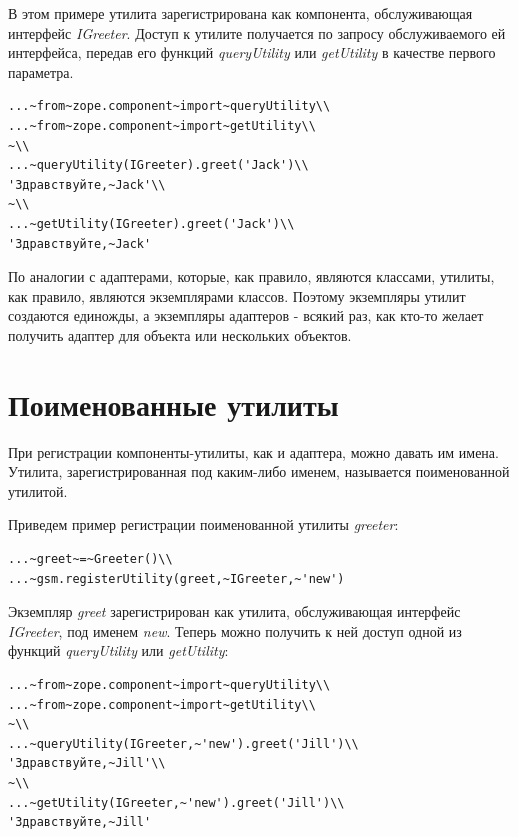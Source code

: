\documentclass[a4paper,openany,twoside,draft]{book}
\providecommand*{\DUroletitlereference}[1]{\textsl{#1}}
\begin{document}
В этом примере утилита зарегистрирована как компонента, обслуживающая
интерфейс \DUroletitlereference{IGreeter}.  Доступ к утилите получается по запросу
обслуживаемого ей интерфейса, передав его функций \DUroletitlereference{queryUtility} или
\DUroletitlereference{getUtility} в качестве первого параметра.

\begin{verbatim}
...~from~zope.component~import~queryUtility\\
...~from~zope.component~import~getUtility\\
~\\
...~queryUtility(IGreeter).greet('Jack')\\
'Здравствуйте,~Jack'\\
~\\
...~getUtility(IGreeter).greet('Jack')\\
'Здравствуйте,~Jack'
\end{verbatim}

По аналогии с адаптерами, которые, как правило, являются классами,
утилиты, как правило, являются экземплярами классов.  Поэтому
экземпляры утилит создаются единожды, а экземпляры адаптеров - всякий
раз, как кто-то желает получить адаптер для объекта или нескольких
объектов.


\section{Поименованные утилиты%
  \label{id42}%
}

При регистрации компоненты-утилиты, как и адаптера, можно давать им
имена.  Утилита, зарегистрированная под каким-либо именем, называется
поименованной утилитой.

Приведем пример регистрации поименованной утилиты \DUroletitlereference{greeter}:

\begin{verbatim}
...~greet~=~Greeter()\\
...~gsm.registerUtility(greet,~IGreeter,~'new')
\end{verbatim}

Экземпляр \DUroletitlereference{greet} зарегистрирован как утилита, обслуживающая
интерфейс \DUroletitlereference{IGreeter}, под именем \DUroletitlereference{new}.  Теперь можно получить к ней
доступ одной из функций \DUroletitlereference{queryUtility} или \DUroletitlereference{getUtility}:

\begin{verbatim}
...~from~zope.component~import~queryUtility\\
...~from~zope.component~import~getUtility\\
~\\
...~queryUtility(IGreeter,~'new').greet('Jill')\\
'Здравствуйте,~Jill'\\
~\\
...~getUtility(IGreeter,~'new').greet('Jill')\\
'Здравствуйте,~Jill'
\end{verbatim}
\end{document}
